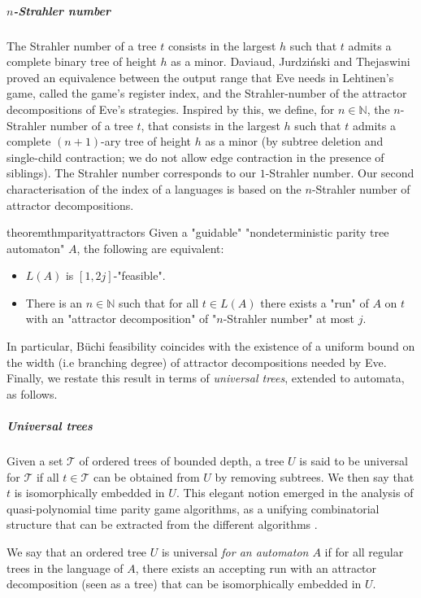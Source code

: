 \documentclass[a4paper,UKenglish,cleveref, autoref, thm-restate]{lipics-v2021}
\newcommand{\NN}{\mathbb{N}}
\newcommand{\A}{{A}}
\newcommand{\T}{\mathcal{T}}
\begin{document}
\subparagraph*{{$n$-Strahler number}}
The Strahler number of a tree $t$ consists in the largest $h$ such that $t$ admits a complete binary tree of height $h$ as a minor.
Daviaud, Jurdzi\'nski and Thejaswini \cite{StrahlerNumber} proved an equivalence between the output range that Eve needs in Lehtinen's  game, called the game's register index, and the Strahler-number of the attractor decompositions of Eve's strategies.
Inspired by this, we define, for $n\in \NN$, the $n$-Strahler number of a tree $t$, that consists in the largest $h$ such that $t$ admits a complete $(n+1)$-ary tree of height $h$ as a minor (by subtree deletion and single-child contraction; we do not allow edge contraction in the presence of siblings). The Strahler number corresponds to our $1$-Strahler number.
 Our second characterisation of the index of a languages is based on the $n$-Strahler number of attractor decompositions.

\begin{restatable}{theorem}{thmparityattractors}\label{cl:parity-attractors}
Given a "guidable" "nondeterministic parity tree automaton" $\A$, the following are equivalent:
\begin{itemize}
\item $L(\A)$ is $[1,2j]$-"feasible".
\item There is an $n\in \NN$ such that for all $t\in L(\A)$ there exists a "run" of $\A$ on $t$ with an "attractor decomposition" of "$n$-Strahler number" at most $j$.
\end{itemize}

\end{restatable}

In particular, B\"uchi feasibility coincides with the existence of a uniform bound on the width (i.e branching degree) of attractor decompositions needed by Eve.
Finally, we restate this result in terms of \textit{universal trees}, extended to automata, as follows.\\

\subparagraph*{{Universal trees}}
Given a set $\T$ of ordered trees of bounded depth, a tree $U$ is said to be universal for $\T$ if all $t\in \T$ can be obtained from $U$ by removing subtrees. We then say that $t$ is isomorphically embedded in $U$. 
This elegant notion emerged in the analysis of quasi-polynomial time parity game algorithms, as a unifying combinatorial structure that can be extracted from the different algorithms \cite{Czerwinski2018UniversalTG}.

We say that an ordered tree $U$ is universal \textit{for an automaton $\A$} if for all regular trees in the language of $\A$, there exists an accepting run with an attractor decomposition (seen as a tree) that can be isomorphically embedded in $U$.
\end{document}
